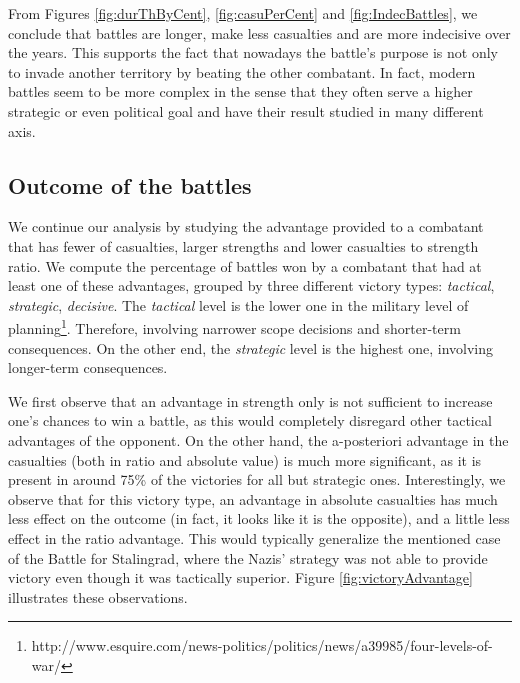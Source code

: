 From Figures \ref{fig:durThByCent}, \ref{fig:casuPerCent} and \ref{fig:IndecBattles}, we conclude that battles are longer, make less casualties and are more indecisive over the years. This supports the fact that nowadays the battle's purpose is not only to invade another territory by beating the other combatant. In fact, modern battles seem to be more complex in the sense that they often serve a higher strategic or even political goal and have their result studied in many different axis.

\subsection{Outcome of the battles}

We continue our analysis by studying the advantage provided to a combatant that has fewer of casualties, larger strengths  and  lower casualties to strength ratio. We compute the percentage of battles won by a combatant that had at least one of these advantages, grouped by three different victory types: \textit{tactical}, \textit{strategic},  \textit{decisive}. The \textit{tactical} level is the lower one in the military level of planning\footnote{http://www.esquire.com/news-politics/politics/news/a39985/four-levels-of-war/}. Therefore, involving narrower scope decisions and shorter-term consequences. On the other end, the \textit{strategic} level is the highest one, involving longer-term
consequences.

We first observe that an advantage in strength only is not sufficient to increase one's chances to win a battle, as this would completely disregard other tactical advantages of the opponent. On the other hand, the a-posteriori advantage in the casualties (both in ratio and absolute value) is much more significant, as it is present in around 75\% of the victories for all but strategic ones. Interestingly, we observe that for this victory type, an advantage in absolute casualties has much less effect on the outcome (in fact, it looks like it is the opposite), and a little less effect in the ratio advantage. This would typically generalize the mentioned case of the Battle for Stalingrad, where the Nazis' strategy was not able to provide victory even though it was tactically superior. Figure \ref{fig:victoryAdvantage} illustrates these observations.

